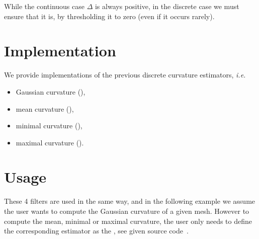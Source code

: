 \documentclass{InsightArticle}
\def \ie {\textit{i.e. }}
\theoremstyle{plain}
\begin{document}
While the continuous case $\Delta$ is always positive, in the discrete case we must ensure that it is, by thresholding it to zero (even if it occurs rarely).


\section{Implementation}
\label{sec:Implementation}

We provide implementations of the previous discrete curvature estimators, \ie
\begin{itemize}
  \item Gaussian curvature (),
  \item mean curvature (),
  \item minimal curvature (),
  \item maximal curvature ().
\end{itemize}

\section{Usage}
\label{sec:Usage}

These 4 filters are used in the same way, and in the following example we assume the user wants to compute the Gaussian curvature of a given mesh. However to compute the mean, minimal or maximal curvature, the user only needs to define the corresponding estimator as the , see given source code~.
\end{document}
